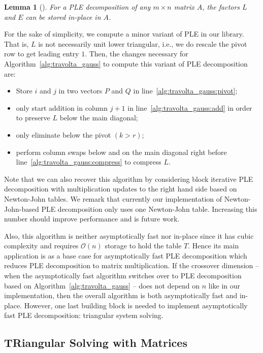 \documentclass{sig-alternate}
\newcommand{\ord}[1]{\ensuremath{\mathcal{O}\!\left(#1\right)}}
\newtheorem{lemma}{Lemma}
\begin{document}
\begin{lemma}[\cite{jeannerod-pernet-storjohann:cup2012}]
For a PLE decomposition of any $m \times n$ matrix $A$, the factors $L$ and $E$ can be stored in-place in $A$.
\end{lemma}

For the sake of simplicity, we compute a minor variant of PLE in our library. That is, $L$ is not necessarily unit lower triangular, i.e., we do rescale the pivot row to get leading entry $1$. Then, the changes necessary for Algorithm~\ref{alg:travolta_gauss} to compute this variant of PLE decomposition are:
\begin{itemize}
 \item Store $i$ and $j$ in two vectors $P$ and $Q$ in line~\ref{alg:travolta_gauss:pivot};
 \item only start addition in column $j+1$ in line~\ref{alg:travolta_gauss:add} in order to preserve $L$ below the main diagonal;
 \item only eliminate below the pivot $(k > r)$;
 \item perform column swaps below and on the main diagonal right before line~\ref{alg:travolta_gauss:compress} to compress $L$.
\end{itemize}

Note that we can also recover this algorithm by considering block iterative PLE decomposition \cite{m4ri-ple} with multiplication updates to the right hand side based on Newton-John tables. We remark that currently our implementation of Newton-John-based PLE decomposition only uses one Newton-John table. Increasing this number should improve performance and is future work.

Also, this algorithm is neither asymptotically fast nor in-place since it has cubic complexity and requires $\ord{n}$ storage to hold the table $T$. Hence its main application is as a base case for asymptotically fast PLE decomposition \cite{jeannerod-pernet-storjohann:cup2012} which reduces PLE decomposition to matrix multiplication. If the crossover dimension -- when the asymptotically fast algorithm switches over to PLE decomposition based on Algorithm~\ref{alg:travolta_gauss} -- does not depend on $n$ like in our implementation, then the overall algorithm is both asymptotically fast and in-place. However, one last building block is needed to implement asymptotically fast PLE decomposition: triangular system solving.

\subsection{TRiangular Solving with Matrices} \label{sec:trsm}
\end{document}
